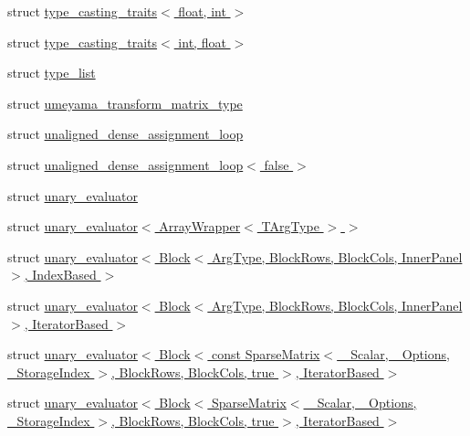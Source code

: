 \begin{DoxyCompactItemize}
\item 
struct \hyperlink{struct_eigen_1_1internal_1_1type__casting__traits_3_01float_00_01int_01_4}{type\+\_\+casting\+\_\+traits$<$ float, int $>$}
\item 
struct \hyperlink{struct_eigen_1_1internal_1_1type__casting__traits_3_01int_00_01float_01_4}{type\+\_\+casting\+\_\+traits$<$ int, float $>$}
\item 
struct \hyperlink{struct_eigen_1_1internal_1_1type__list}{type\+\_\+list}
\item 
struct \hyperlink{struct_eigen_1_1internal_1_1umeyama__transform__matrix__type}{umeyama\+\_\+transform\+\_\+matrix\+\_\+type}
\item 
struct \hyperlink{struct_eigen_1_1internal_1_1unaligned__dense__assignment__loop}{unaligned\+\_\+dense\+\_\+assignment\+\_\+loop}
\item 
struct \hyperlink{struct_eigen_1_1internal_1_1unaligned__dense__assignment__loop_3_01false_01_4}{unaligned\+\_\+dense\+\_\+assignment\+\_\+loop$<$ false $>$}
\item 
struct \hyperlink{struct_eigen_1_1internal_1_1unary__evaluator}{unary\+\_\+evaluator}
\item 
struct \hyperlink{struct_eigen_1_1internal_1_1unary__evaluator_3_01_array_wrapper_3_01_t_arg_type_01_4_01_4}{unary\+\_\+evaluator$<$ Array\+Wrapper$<$ T\+Arg\+Type $>$ $>$}
\item 
struct \hyperlink{struct_eigen_1_1internal_1_1unary__evaluator_3_01_block_3_01_arg_type_00_01_block_rows_00_01_blo4d5c305426f8b1ea1436bf5cefc2693d}{unary\+\_\+evaluator$<$ Block$<$ Arg\+Type, Block\+Rows, Block\+Cols, Inner\+Panel $>$, Index\+Based $>$}
\item 
struct \hyperlink{struct_eigen_1_1internal_1_1unary__evaluator_3_01_block_3_01_arg_type_00_01_block_rows_00_01_blodb73497179e7c432f93b3052e2754983}{unary\+\_\+evaluator$<$ Block$<$ Arg\+Type, Block\+Rows, Block\+Cols, Inner\+Panel $>$, Iterator\+Based $>$}
\item 
struct \hyperlink{struct_eigen_1_1internal_1_1unary__evaluator_3_01_block_3_01const_01_sparse_matrix_3_01___scalarcdbc8f3eebef46901de7cc88abb0e702}{unary\+\_\+evaluator$<$ Block$<$ const Sparse\+Matrix$<$ \+\_\+\+Scalar, \+\_\+\+Options, \+\_\+\+Storage\+Index $>$, Block\+Rows, Block\+Cols, true $>$, Iterator\+Based $>$}
\item 
struct \hyperlink{struct_eigen_1_1internal_1_1unary__evaluator_3_01_block_3_01_sparse_matrix_3_01___scalar_00_01__bc162881393553b921ff4fd46550ce3d}{unary\+\_\+evaluator$<$ Block$<$ Sparse\+Matrix$<$ \+\_\+\+Scalar, \+\_\+\+Options, \+\_\+\+Storage\+Index $>$, Block\+Rows, Block\+Cols, true $>$, Iterator\+Based $>$}

\end{DoxyCompactItemize}

